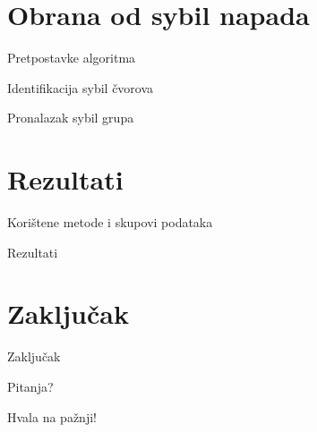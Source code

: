 \documentclass{beamer}
\begin{document}
\section{Obrana od sybil napada}

\begin{frame}{Pretpostavke algoritma}
\end{frame}

\begin{frame}{Identifikacija sybil čvorova}
\end{frame}

\begin{frame}{Pronalazak sybil grupa}
\end{frame}

\section{Rezultati}

\begin{frame}{Korištene metode i skupovi podataka}
\end{frame}

\begin{frame}{Rezultati}
\end{frame}

\section{Zaključak}

\begin{frame}{Zaključak}
\end{frame}

\begin{frame}[standout]
  \Huge{\centerline{Pitanja?}}
\end{frame}

\begin{frame}[standout]
  \Huge{\centerline{Hvala na pažnji!}}
\end{frame}
\end{document}
